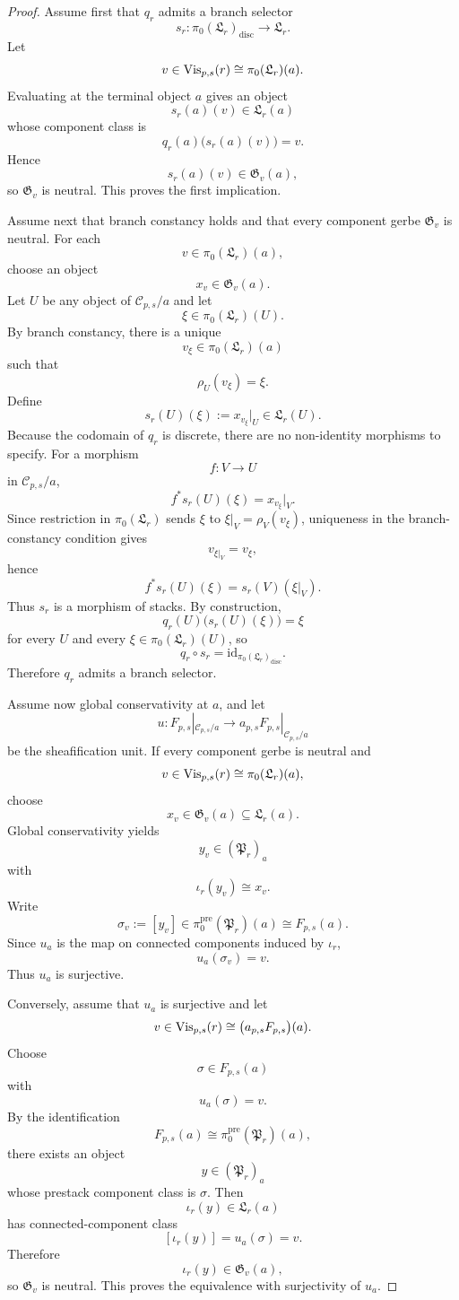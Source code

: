 \begin{proof}
Assume first that $q_r$ admits a branch selector
\[
s_r:\pi_0(\mathfrak L_r)_{\mathrm{disc}}\to \mathfrak L_r.
\]
Let
\[
v\in \mathrm{Vis}_{p,s}(r)\cong \pi_0(\mathfrak L_r)(a).
\]
Evaluating at the terminal object $a$ gives an object
\[
s_r(a)(v)\in \mathfrak L_r(a)
\]
whose component class is
\[
q_r(a)\bigl(s_r(a)(v)\bigr)=v.
\]
Hence
\[
s_r(a)(v)\in \mathfrak G_v(a),
\]
so $\mathfrak G_v$ is neutral. This proves the first implication.

Assume next that branch constancy holds and that every component gerbe $\mathfrak G_v$ is neutral. For each
\[
v\in \pi_0(\mathfrak L_r)(a),
\]
choose an object
\[
x_v\in \mathfrak G_v(a).
\]
Let $U$ be any object of $\mathcal C_{p,s}/a$ and let
\[
\xi\in \pi_0(\mathfrak L_r)(U).
\]
By branch constancy, there is a unique
\[
v_\xi\in \pi_0(\mathfrak L_r)(a)
\]
such that
\[
\rho_U(v_\xi)=\xi.
\]
Define
\[
s_r(U)(\xi):=x_{v_\xi}|_U\in \mathfrak L_r(U).
\]
Because the codomain of $q_r$ is discrete, there are no non-identity morphisms to specify. For a morphism
\[
f:V\to U
\]
in $\mathcal C_{p,s}/a$,
\[
f^*s_r(U)(\xi)=x_{v_\xi}|_V.
\]
Since restriction in $\pi_0(\mathfrak L_r)$ sends $\xi$ to $\xi|_V=\rho_V(v_\xi)$, uniqueness in the branch-constancy condition gives
\[
v_{\xi|_V}=v_\xi,
\]
hence
\[
f^*s_r(U)(\xi)=s_r(V)(\xi|_V).
\]
Thus $s_r$ is a morphism of stacks. By construction,
\[
q_r(U)\bigl(s_r(U)(\xi)\bigr)=\xi
\]
for every $U$ and every $\xi\in \pi_0(\mathfrak L_r)(U)$, so
\[
q_r\circ s_r=\mathrm{id}_{\pi_0(\mathfrak L_r)_{\mathrm{disc}}}.
\]
Therefore $q_r$ admits a branch selector.

Assume now global conservativity at $a$, and let
\[
u:F_{p,s}|_{\mathcal C_{p,s}/a}\to a_{p,s}F_{p,s}|_{\mathcal C_{p,s}/a}
\]
be the sheafification unit. If every component gerbe is neutral and
\[
v\in \mathrm{Vis}_{p,s}(r)\cong \pi_0(\mathfrak L_r)(a),
\]
choose
\[
x_v\in \mathfrak G_v(a)\subseteq \mathfrak L_r(a).
\]
Global conservativity yields
\[
y_v\in (\mathfrak P_r)_a
\]
with
\[
\iota_r(y_v)\cong x_v.
\]
Write
\[
\sigma_v:=[y_v]\in \pi_0^{\mathrm{pre}}(\mathfrak P_r)(a)\cong F_{p,s}(a).
\]
Since $u_a$ is the map on connected components induced by $\iota_r$,
\[
u_a(\sigma_v)=v.
\]
Thus $u_a$ is surjective.

Conversely, assume that $u_a$ is surjective and let
\[
v\in \mathrm{Vis}_{p,s}(r)\cong \bigl(a_{p,s}F_{p,s}\bigr)(a).
\]
Choose
\[
\sigma\in F_{p,s}(a)
\]
with
\[
u_a(\sigma)=v.
\]
By the identification
\[
F_{p,s}(a)\cong \pi_0^{\mathrm{pre}}(\mathfrak P_r)(a),
\]
there exists an object
\[
y\in (\mathfrak P_r)_a
\]
whose prestack component class is $\sigma$. Then
\[
\iota_r(y)\in \mathfrak L_r(a)
\]
has connected-component class
\[
[\iota_r(y)]=u_a(\sigma)=v.
\]
Therefore
\[
\iota_r(y)\in \mathfrak G_v(a),
\]
so $\mathfrak G_v$ is neutral. This proves the equivalence with surjectivity of $u_a$.


\end{proof}
